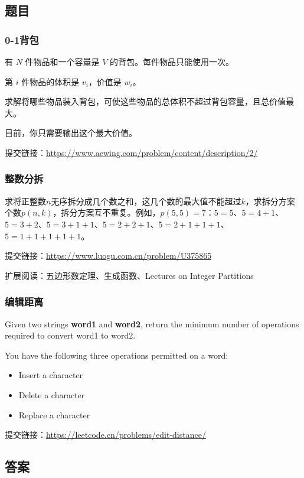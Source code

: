 \documentclass[12pt]{ctexart}
\begin{document}
\subsection{题目}
\subsubsection{0-1背包}
有 $N$ 件物品和一个容量是 $V$ 的背包。每件物品只能使用一次。

第 $i$ 件物品的体积是 $v_i$，价值是 $w_i$。

求解将哪些物品装入背包，可使这些物品的总体积不超过背包容量，且总价值最大。

目前，你只需要输出这个最大价值。\newline

提交链接：\url{https://www.acwing.com/problem/content/description/2/}

\subsubsection{整数分拆}
求将正整数$n$无序拆分成几个数之和，这几个数的最大值不能超过$k$，求拆分方案个数$p(n, k)$，拆分方案互不重复。例如，$p(5, 5)=7$：$5 = 5$、$5 = 4 + 1$、$5 = 3 + 2$、$5 = 3 + 1 + 1$、$5 = 2 + 2 + 1$、$5 = 2 + 1 + 1 + 1$、$5 = 1 + 1 + 1 + 1 + 1$。

\newline

提交链接：\url{https://www.luogu.com.cn/problem/U375865}

扩展阅读：五边形数定理、生成函数、Lectures on Integer Partitions

\subsubsection{编辑距离}
Given two strings \textbf{word1} and \textbf{word2}, return the minimum number of operations required to convert word1 to word2.

You have the following three operations permitted on a word:
\begin{itemize}
    \item Insert a character
    \item Delete a character
    \item Replace a character
\end{itemize}\newline

提交链接：\url{https://leetcode.cn/problems/edit-distance/}

\newpage
\subsection{答案}
\end{document}
